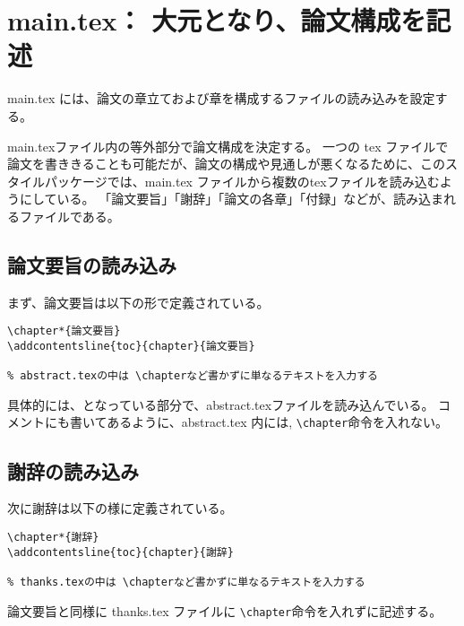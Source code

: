 \section{main.tex： 大元となり、論文構成を記述}
main.tex には、論文の章立ておよび章を構成するファイルの読み込みを設定する。

main.texファイル内の等外部分で論文構成を決定する。
一つの tex ファイルで論文を書ききることも可能だが、論文の構成や見通しが悪くなるために、このスタイルパッケージでは、main.tex ファイルから複数のtexファイルを読み込むようにしている。
「論文要旨」「謝辞」「論文の各章」「付録」などが、読み込まれるファイルである。

\subsection{論文要旨の読み込み}
まず、論文要旨は以下の形で定義されている。
\begin{breakbox}
{\small
\begin{verbatim}
\chapter*{論文要旨}
\addcontentsline{toc}{chapter}{論文要旨}

% abstract.texの中は \chapterなど書かずに単なるテキストを入力する
\end{verbatim}
}
\end{breakbox}
具体的には、\verb++となっている部分で、abstract.texファイルを読み込んでいる。
コメントにも書いてあるように、abstract.tex 内には, \verb+\chapter+命令を入れない。

\subsection{謝辞の読み込み}
次に謝辞は以下の様に定義されている。
\begin{breakbox}
{\small
\begin{verbatim}
\chapter*{謝辞}
\addcontentsline{toc}{chapter}{謝辞}

% thanks.texの中は \chapterなど書かずに単なるテキストを入力する
\end{verbatim}
}
\end{breakbox}
論文要旨と同様に thanks.tex ファイルに \verb+\chapter+命令を入れずに記述する。

